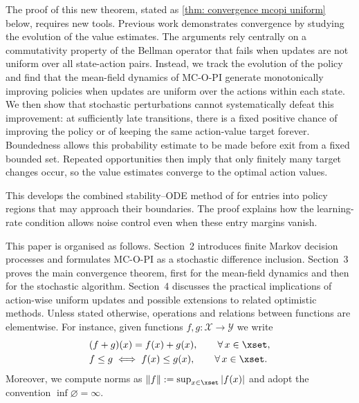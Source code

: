 

The proof of this new theorem, stated as \autoref{thm: convergence mcopi uniform} below, requires new tools. 
Previous work demonstrates convergence by studying the evolution of the value estimates. The arguments rely centrally on a commutativity property of the Bellman operator that fails when updates are not uniform over all state-action pairs.
Instead, we track the evolution of the policy and find that the mean-field dynamics of MC-O-PI generate monotonically improving policies when updates are uniform over the actions within each state.
We then show that stochastic perturbations cannot systematically defeat this improvement: at sufficiently late transitions, there is a fixed positive chance of improving the policy or of keeping the same action-value target forever. Boundedness allows this probability estimate to be made before exit from a fixed bounded set. Repeated opportunities then imply that only finitely many target changes occur, so the value estimates converge to the optimal action values.

This develops the combined stability--ODE method of \citet[Section~5.4]{Kushner2003StochasticApplications} for entries into policy regions that may approach their boundaries. The proof explains how the learning-rate condition allows noise control even when these entry margins vanish.

This paper is organised as follows. Section~2 introduces finite Markov decision
processes and formulates MC-O-PI as a stochastic difference inclusion. Section~3 proves the
main convergence theorem, first for the mean-field dynamics and then for the stochastic
algorithm. Section~4 discusses the practical implications of action-wise uniform updates
and possible extensions to related optimistic methods. 
Unless stated otherwise, operations and relations between functions are elementwise. For instance, given functions $f, g : \mathcal X \to \mathcal Y$ we write
\begin{align*}
&(f + g)(x) = f(x) + g(x), \qquad \forall \, x \in \xset ,
    \\
&f \le g \iff f(x) \le g(x), \qquad \forall \, x \in \xset .
\end{align*}
Moreover, we compute norms as $\|f\| := \sup_{x \in \xset} |f(x)|$ 
and adopt the convention $\inf \varnothing = \infty$.


